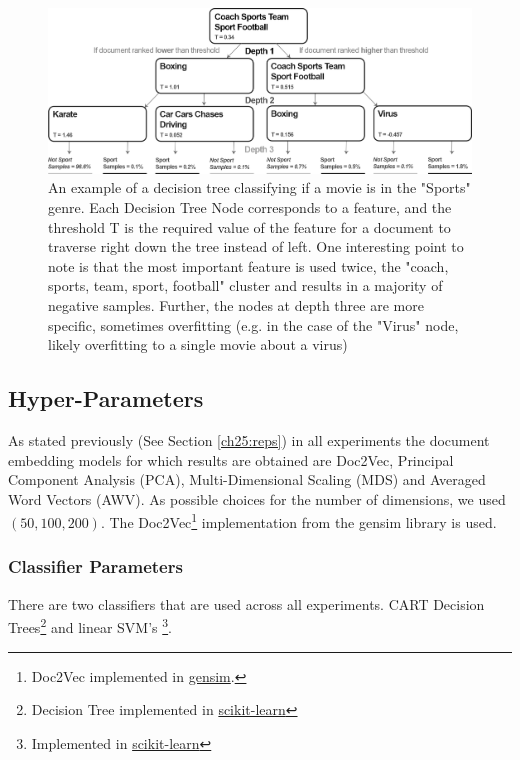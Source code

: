 \begin{figure}[t]
	\includegraphics[width=450px]{images/decision_tree_ex.png}
	\centering
	\caption{An example of a decision tree classifying if a movie is in the "Sports" genre. Each Decision Tree Node corresponds to a feature, and the threshold T is the required value of the feature for a document to traverse right down the tree instead of left. One interesting point to note is that the most important feature is used twice, the "coach, sports, team, sport, football" cluster and results in a majority of negative samples. Further, the nodes at depth three are more specific, sometimes overfitting (e.g. in the case of the "Virus" node, likely overfitting to a single movie about a virus) }\label{ch3:DecisionTree}
\end{figure}




\subsection{Hyper-Parameters}\label{ch3:hyperparam}

 As stated previously (See Section \ref{ch25:reps}) in all experiments the document embedding models for which results are obtained are Doc2Vec, Principal Component Analysis (PCA), Multi-Dimensional Scaling (MDS) and Averaged Word Vectors (AWV). As possible choices for the number of dimensions, we used $(50, 100, 200)$. The Doc2Vec\footnote{Doc2Vec implemented in \href{https://radimrehurek.com/gensim/models/doc2vec.html}{gensim}.} implementation from the gensim library is used. 

\subsubsection{Classifier Parameters}\label{ch3:classifierparmas}

There are two classifiers that are used across all experiments. CART Decision Trees\footnote{Decision Tree implemented in \href{https://scikit-learn.org/stable/modules/generated/sklearn.tree.DecisionTreeClassifier.html}{scikit-learn}} and linear SVM's \footnote{Implemented in \href{https://scikit-learn.org/stable/modules/generated/sklearn.tree.DecisionTreeClassifier.html}{scikit-learn}}.

